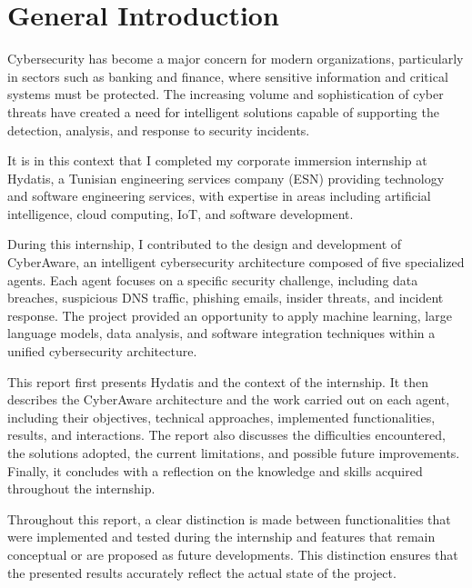 \documentclass[12pt,a4paper]{report}
\newcommand{\ProjectName}{CyberAware}
\begin{document}
\clearpage
{}


\chapter*{General Introduction}

Cybersecurity has become a major concern for modern organizations, particularly in sectors such as banking and finance, where sensitive information and critical systems must be protected. The increasing volume and sophistication of cyber threats have created a need for intelligent solutions capable of supporting the detection, analysis, and response to security incidents.

It is in this context that I completed my corporate immersion internship at Hydatis, a Tunisian engineering services company (ESN) providing technology and software engineering services, with expertise in areas including artificial intelligence, cloud computing, IoT, and software development.

During this internship, I contributed to the design and development of \ProjectName{}, an intelligent cybersecurity architecture composed of five specialized agents. Each agent focuses on a specific security challenge, including data breaches, suspicious DNS traffic, phishing emails, insider threats, and incident response. The project provided an opportunity to apply machine learning, large language models, data analysis, and software integration techniques within a unified cybersecurity architecture.

This report first presents Hydatis and the context of the internship. It then describes the \ProjectName{} architecture and the work carried out on each agent, including their objectives, technical approaches, implemented functionalities, results, and interactions. The report also discusses the difficulties encountered, the solutions adopted, the current limitations, and possible future improvements. Finally, it concludes with a reflection on the knowledge and skills acquired throughout the internship.

Throughout this report, a clear distinction is made between functionalities that were implemented and tested during the internship and features that remain conceptual or are proposed as future developments. This distinction ensures that the presented results accurately reflect the actual state of the project.
\end{document}
